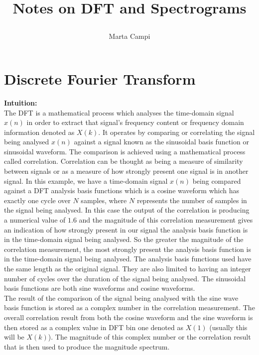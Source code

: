 \documentclass[10pt,english]{article}
\title{ \begin{LARGE}
\textbf{Notes on DFT and Spectrograms} 
\end{LARGE} }
\author{Marta Campi}
\begin{document}
\maketitle







\section{Discrete Fourier Transform}

\textbf{Intuition:}\\
The DFT is a mathematical process which analyses the time-domain signal $x(n)$ in order to extract that signal's frequency content or frequency domain information denoted as $X(k)$. It operates by comparing or correlating the signal being analysed $x(n)$ against a signal known as the sinusoidal basis function or sinusoidal waveform. The comparison is achieved using a mathematical process called correlation. Correlation can be thought as being a measure of similarity between signals or as a measure of how strongly present one signal is in another signal. In this example, we have a time-domain signal $x(n)$ being compared against a DFT analysis basis functions which is a cosine waveform which has exactly one cycle over $N$ samples, where $N$ represents the number of samples in the signal being analysed. In this case the output of the correlation is producing a numerical value of $1.6$ and the magnitude of this correlation measurement gives an indication of how strongly present in our signal the analysis basis function is in the time-domain signal being analysed. So the greater the magnitude of the correlation measurement, the most strongly present the analysis basis function is in the time-domain signal being analysed. The analysis basis functions used have the same length as the original signal. They are also limited to having an integer number of cycles over the duration of the signal being analysed. The sinusoidal basis functions are both sine waveforms and cosine waveforms.\\
The result of the comparison of the signal being analysed with the sine wave basis function is stored as a complex number in the correlation measurement. The overall correlation result from both the cosine waveform and the sine waveform is then stored as a complex value in DFT bin one denoted as $X(1)$ (usually this will be $X(k)$). The magnitude of this complex number or the correlation result that is then used to produce the magnitude spectrum. \\
\end{document}
